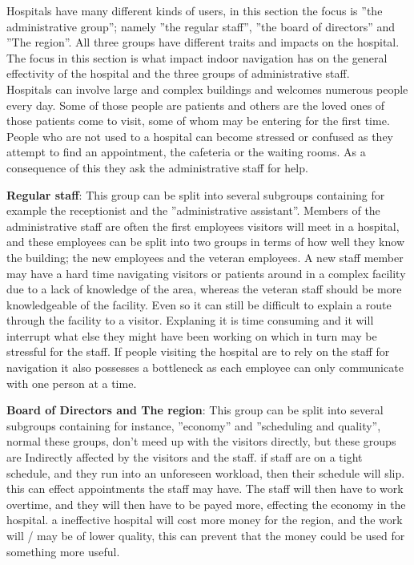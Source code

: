Hospitals have many different kinds of users, in this section the focus is ''the administrative group''; namely ''the regular staff'', ''the board of directors'' and ''The region''. All three groups have different traits and impacts on the hospital. \\ The focus in this section is what impact indoor navigation has on the general effectivity of the hospital and the three groups of administrative staff.\\
Hospitals can involve large and complex buildings and welcomes numerous people every day. Some of those people are patients and others are the loved ones of those patients come to visit, some of whom may be entering for the first time. People who are not used to a hospital can become stressed or confused as they attempt to find an appointment, the cafeteria or the waiting rooms. As a consequence of this they ask the administrative staff for help.

\textbf{Regular staff}: This group can be split into several subgroups containing for example the receptionist and the ''administrative assistant''. Members of the administrative staff are often the first employees visitors will meet in a hospital, and these employees can be split into two groups in terms of how well they know the building; the new employees and the veteran employees. A new staff member may have a hard time navigating visitors or patients around in a complex facility due to a lack of knowledge of the area, whereas the veteran staff should be more knowledgeable of the facility. Even so it can still be difficult to explain a route through the facility to a visitor. Explaning it is time consuming and it will interrupt what else they might have been working on which in turn may be stressful for the staff. If people visiting the hospital are to rely on the staff for navigation it also possesses a bottleneck as each employee can only communicate with one person at a time.

\textbf{Board of Directors and The region}: This group can be split into several subgroups containing for instance, ''economy'' and ''scheduling and quality'', normal these groups, don't meed up with the visitors directly, but these groups are Indirectly affected by the visitors and the staff. if staff are on a tight schedule, and they run into an unforeseen workload, then their schedule will slip. this can effect appointments the staff may have. The staff will then have to work overtime, and they will then have to be payed more, effecting the economy in the hospital. a ineffective hospital will cost more money for the region, and the work will / may be of lower quality, this can prevent that the money could be used for something more useful.

